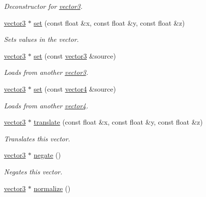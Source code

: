 \begin{DoxyCompactItemize}
\begin{DoxyCompactList}\small\item\em Deconstructor for \hyperlink{classflounder_1_1vector3}{vector3}. \end{DoxyCompactList}\item 
\hyperlink{classflounder_1_1vector3}{vector3} $\ast$ \hyperlink{classflounder_1_1vector3_ad6b031406e580bdff034a8a8530800f3}{set} (const float \&x, const float \&y, const float \&z)
\begin{DoxyCompactList}\small\item\em Sets values in the vector. \end{DoxyCompactList}\item 
\hyperlink{classflounder_1_1vector3}{vector3} $\ast$ \hyperlink{classflounder_1_1vector3_a3b17ec2712468c1cca948c5f5a35a909}{set} (const \hyperlink{classflounder_1_1vector3}{vector3} \&source)
\begin{DoxyCompactList}\small\item\em Loads from another \hyperlink{classflounder_1_1vector3}{vector3}. \end{DoxyCompactList}\item 
\hyperlink{classflounder_1_1vector3}{vector3} $\ast$ \hyperlink{classflounder_1_1vector3_a7a6d2d66bcd15ab4c71e42853db3c49d}{set} (const \hyperlink{classflounder_1_1vector4}{vector4} \&source)
\begin{DoxyCompactList}\small\item\em Loads from another \hyperlink{classflounder_1_1vector4}{vector4}. \end{DoxyCompactList}\item 
\hyperlink{classflounder_1_1vector3}{vector3} $\ast$ \hyperlink{classflounder_1_1vector3_a015748c61b6fe58697239bf3abe83b1f}{translate} (const float \&x, const float \&y, const float \&z)
\begin{DoxyCompactList}\small\item\em Translates this vector. \end{DoxyCompactList}\item 
\hyperlink{classflounder_1_1vector3}{vector3} $\ast$ \hyperlink{classflounder_1_1vector3_a44cff187eea36ab0e0790e76f82fcc5d}{negate} ()
\begin{DoxyCompactList}\small\item\em Negates this vector. \end{DoxyCompactList}\item 
\hyperlink{classflounder_1_1vector3}{vector3} $\ast$ \hyperlink{classflounder_1_1vector3_aabd9f495ffdbd3988227ca9b1bf5f794}{normalize} ()

\end{DoxyCompactItemize}

